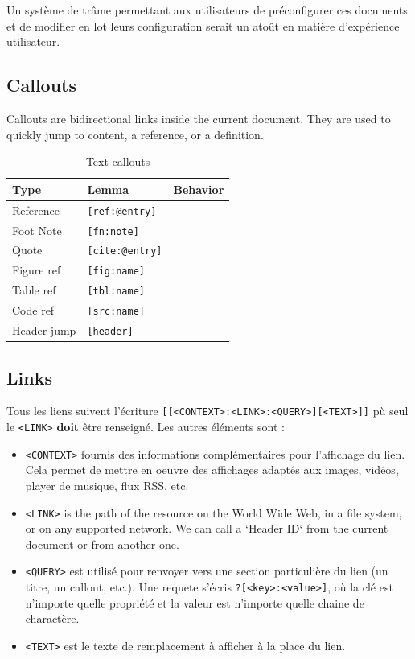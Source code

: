 \documentclass[a4paper,12pt]{article}
\begin{document}
Un système de trâme permettant aux utilisateurs de préconfigurer ces documents et de modifier en lot leurs configuration serait un atoût en matière d'expérience utilisateur.
\subsection{Callouts}
\label{sec:org0ccae96}
Callouts are bidirectional links inside the current document. They are used to quickly jump to content, a reference, or a definition.

\begin{table}[htbp]
\caption{Text callouts}
\centering
\begin{tabular}{lll}
\hline
Type & Lemma & Behavior\\
\hline
Reference & \texttt{[ref:@entry]} & \\
Foot Note & \texttt{[fn:note]} & \\
Quote & \texttt{[cite:@entry]} & \\
Figure ref & \texttt{[fig:name]} & \\
Table ref & \texttt{[tbl:name]} & \\
Code ref & \texttt{[src:name]} & \\
Header jump & \texttt{[header]} & \\
\hline
\end{tabular}
\end{table}
\subsection{Links}
\label{sec:org2cf0a46}
Tous les liens suivent l'écriture \texttt{[[<CONTEXT>:<LINK>:<QUERY>][<TEXT>]]} pù seul le \texttt{<LINK>} \textbf{doit} être renseigné. Les autres éléments sont : 
\begin{itemize}
\item \texttt{<CONTEXT>} fournis des informations complémentaires pour l'affichage du lien. Cela permet de mettre en oeuvre des affichages adaptés aux images, vidéos, player de musique, flux RSS, etc.
\item \texttt{<LINK>} is the path of the resource on the World Wide Web, in a file system, or on any supported network. We can call a `Header ID` from the current document or from another one.
\item \texttt{<QUERY>} est utilisé pour renvoyer vers une section particulière du lien (un titre, un callout, etc.). Une requete s'écris \texttt{?[<key>:<value>]}, où la clé est n'importe quelle propriété et la valeur est n'importe quelle chaine de charactère.
\item \texttt{<TEXT>} est le texte de remplacement à afficher à la place du lien.
\end{itemize}
\end{document}
